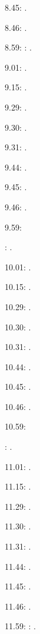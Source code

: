 \documentclass[italian]{article}
\begin{document}
8.45:   .

8.46:   .

8.59:   
:  .

9.01:   . 

9.15:   . 

9.29:   . 

9.30:   .

9.31:   .

9.44:   .

9.45:   .

9.46:   .

9.59:   

:  .

10.01:   . 

10.15:   . 

10.29:   . 

10.30:   .

10.31:   .

10.44:   .

10.45:   .

10.46:   .

10.59:   

:  .

11.01:   . 

11.15:   . 

11.29:   . 

11.30:   .

11.31:   .

11.44:   .

11.45:   .

11.46:   .

11.59:   
:   .
\end{document}
